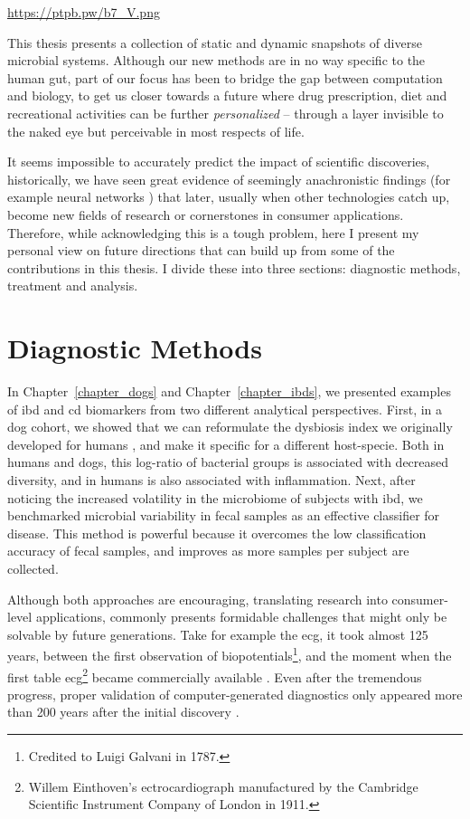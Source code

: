 \glsresetall

\url{https://ptpb.pw/b7_V.png}

This thesis presents a collection of static and dynamic snapshots of diverse
microbial systems. Although our new methods are in no way specific to the human
gut, part of our focus has been to bridge the gap between computation and
biology, to get us closer towards a future where drug prescription, diet and
recreational activities can be further \textit{personalized} -- through a layer
invisible to the naked eye but perceivable in most respects of life.

It seems impossible to accurately predict the impact of scientific discoveries,
historically, we have seen great evidence of seemingly anachronistic findings
(for example neural networks \cite{Tem10}) that later, usually
when other technologies catch up, become new fields of research or cornerstones
in consumer applications.  Therefore, while acknowledging this is a tough
problem, here I present my personal view on future directions that can build up
from some of the contributions in this thesis. I divide these into three 
sections: diagnostic methods, treatment and analysis.

\section{Diagnostic Methods}

In Chapter~\ref{chapter_dogs} and Chapter~\ref{chapter_ibds}, we presented
examples of \gls{ibd} and \gls{cd} biomarkers from two different analytical 
perspectives.  First, in a dog cohort, we showed that we can reformulate the 
dysbiosis index we originally developed for humans \cite{Gevers2014}, and make 
it specific for a different host\hyp{}specie. Both in humans and dogs, this 
log-ratio of bacterial groups is associated with decreased diversity, and in 
humans is also associated with inflammation. Next, after noticing the increased 
volatility in the microbiome of subjects with \gls{ibd}, we benchmarked 
microbial variability in fecal samples as an effective classifier for disease.  
This method is powerful because it overcomes the low classification accuracy of 
fecal samples, and improves as more samples per subject are collected.

Although both approaches are encouraging, translating research into 
consumer\hyp{}level applications, commonly presents formidable challenges that 
might only be solvable by future generations.  Take for example the \gls{ecg}, 
it took almost 125 years, between the first observation of 
biopotentials\footnote{Credited to Luigi Galvani in 1787.}, and the moment when 
the first table \gls{ecg}\footnote{Willem Einthoven's ectrocardiograph 
manufactured by the Cambridge Scientific Instrument Company of London in 1911.} 
became commercially available \cite{ECGZywietz}. Even after the tremendous 
progress, proper validation of computer-generated diagnostics only appeared 
more than 200 years after the initial discovery \cite{njem_ecg}.

